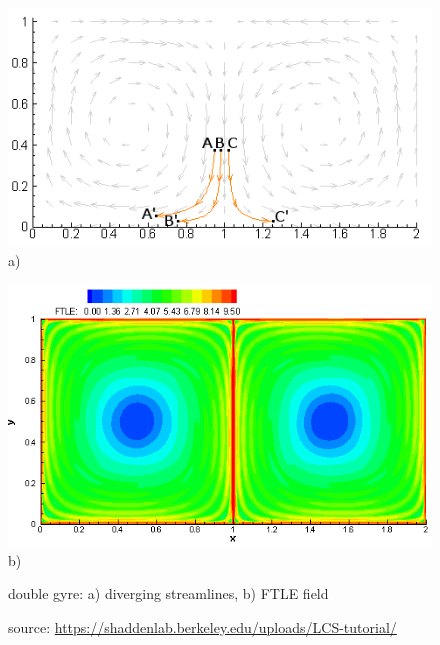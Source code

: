 \documentclass{scrartcl}
\begin{document}
\begin{figure}[!t]
\hskip 22pt
  \begin{minipage}[!t]{0.4\textwidth}
    \includegraphics[width=\textwidth]{img/diverge.png}
	a)
   \label{diverge}
  \end{minipage} \hskip 30pt
  \begin{minipage}[!t]{0.4\textwidth}
    \includegraphics[width=\textwidth]{img/ftle_gyre.png}
	b)
  \end{minipage}
  \caption{double gyre: a) diverging streamlines, b) FTLE field}
  \label{ftle_gyre}
  \caption*{source: \url{https://shaddenlab.berkeley.edu/uploads/LCS-tutorial/}}
\end{figure}

%
%
%
\end{document}
